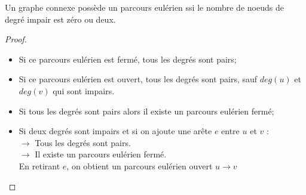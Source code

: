 \begin{mytheo} 
  Un graphe connexe possède un parcours eulérien ssi le nombre de noeuds de degré impair est zéro ou deux.
  \begin{proof}
    \noindent
    \newline
    \fbox{$\Longrightarrow$}
    \newline
    \begin{itemize}
      \item Si ce parcours eulérien est fermé, tous les degrés sont pairs;
      \item Si ce parcours eulérien est ouvert, tous les degrés sont pairs, sauf $deg(u)$ et $deg(v)$ qui sont impairs.\\
    \end{itemize}

    \noindent
    \fbox{$\Longleftarrow$}
    \newline
    \begin{itemize}
      \item Si tous les degrés sont pairs alors il existe un parcours eulérien fermé;
      \item Si deux degrés sont impairs et si on ajoute une arête $e$ entre $u$ et $v$ :\\
      $\rightarrow$ Tous les degrés sont pairs.\\
      $\rightarrow$ Il existe un parcours eulérien fermé.\\
      En retirant $e$, on obtient un parcours eulérien ouvert $u \rightarrow v$
    \end{itemize}
  \end{proof}
\end{mytheo}

